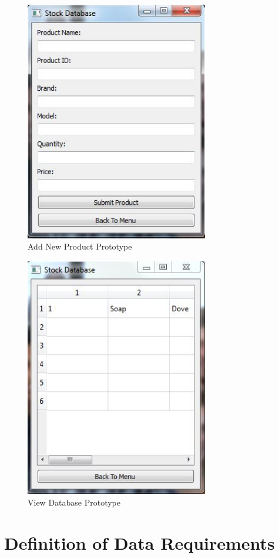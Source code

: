\begin{figure}[H]
	\centering
	\includegraphics[width= 8cm, height = 10.5cm]{Design/images/new_product_prototype.JPG}
	\caption {Add New Product Prototype} \label{fig:add_new_product_prototype}
\end{figure}

\begin{figure}[H]
	\centering
	\includegraphics[width= 8cm, height = 10.5cm]{Design/images/database_prototype.JPG}
	\caption {View Database Prototype} \label{fig:view_database_prototype}
\end{figure}
\section{Definition of Data Requirements}

